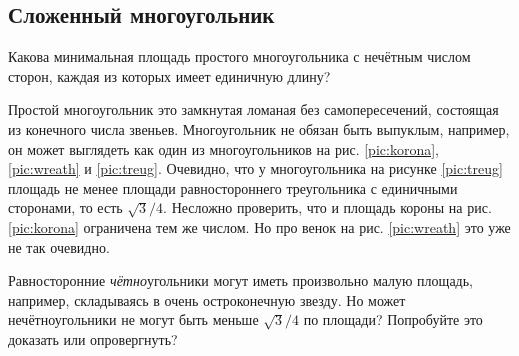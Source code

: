 \subsection*{Сложенный многоугольник}\label{Сложенный многоугольник}

Какова минимальная площадь простого многоугольника с нечётным числом сторон, каждая из которых имеет единичную длину?

Простой многоугольник это замкнутая ломаная без самопересечений, состоящая из конечного числа звеньев.
Многоугольник не обязан быть выпуклым,
например, он может выглядеть как один из многоугольников на рис. \ref{pic:korona},
\ref{pic:wreath} и \ref{pic:treug}.
Очевидно, что у многоугольника на рисунке \ref{pic:treug} площадь не менее площади равностороннего треугольника с единичными сторонами, то есть $\sqrt{3}/4$.
Несложно проверить, что и площадь короны на рис. \ref{pic:korona} ограничена тем же числом.
Но про венок на рис. \ref{pic:wreath} это уже не так очевидно.

Равносторонние \emph{чётно}угольники могут иметь произвольно малую площадь, например, складываясь в очень остроконечную звезду.
Но может нечётноугольники не могут быть меньше $\sqrt{3}/4$ по площади?
Попробуйте это доказать или опровергнуть?

